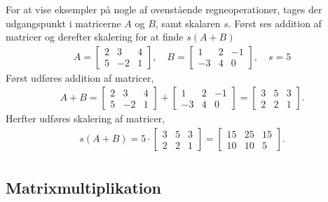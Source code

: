 \begin{eks}
For at vise eksempler på nogle af ovenstående regneoperationer, tages der udgangspunkt i matricerne $A$ og $B$, samt skalaren $s$. Først ses addition af matricer og derefter skalering for at finde $s(A+B)$
\begin{align*}
A= \begin{bmatrix}
	2 & 3 & 4 \\
	5 & -2 & 1 	
\end{bmatrix}, \quad
B= \begin{bmatrix}
	1 & 2 & -1 \\
	-3 & 4 & 0
\end{bmatrix}, \quad
s=5
\end{align*}
Først udføres addition af matricer,
\begin{align*}
A+B= \begin{bmatrix}
	2 & 3 & 4 \\
	5 & -2 & 1 	
\end{bmatrix}  
+ \begin{bmatrix}
	1 & 2 & -1 \\
	-3 & 4 & 0
\end{bmatrix}
= \begin{bmatrix}
	3 & 5 & 3 \\
	2 & 2 & 1
\end{bmatrix}.
\end{align*}
Herfter udføres skalering af matricer,
\begin{align*}
s(A+B)= 5 \cdot \begin{bmatrix}
	3 & 5 & 3 \\
	2 & 2 & 1
\end{bmatrix}
= \begin{bmatrix}
	15 & 25 & 15 \\
	10 & 10 & 5
\end{bmatrix}.\\
\end{align*}
\end{eks}

\subsection{Matrixmultiplikation}

